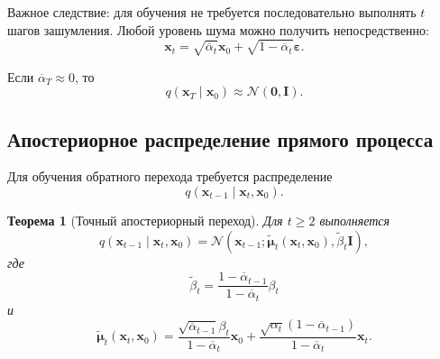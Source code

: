 \documentclass[12pt,a4paper]{article}
\newtheorem{theorem}{Теорема}[section]
\theoremstyle{definition}
\newcommand{\N}{\mathcal{N}}
\newcommand{\eps}{\varepsilon}
\newcommand{\1}{\mathbf{1}}
\begin{document}
Важное следствие: для обучения не требуется последовательно
выполнять $t$ шагов зашумления. Любой уровень шума можно получить
непосредственно:
\[
    \bm{x}_t
    =
    \sqrt{\overline{\alpha}_t}\bm{x}_0
    +
    \sqrt{1-\overline{\alpha}_t}\bm{\eps}.
\]

Если $\overline{\alpha}_T\approx 0$, то
\[
    q(\bm{x}_T\mid\bm{x}_0)
    \approx
    \N(\bm{0},\bm{I}).
\]

\subsection{Апостериорное распределение прямого процесса}

Для обучения обратного перехода требуется распределение
\[
    q(\bm{x}_{t-1}\mid\bm{x}_t,\bm{x}_0).
\]

\begin{theorem}[Точный апостериорный переход]
Для $t\geq 2$ выполняется
\[
    q(\bm{x}_{t-1}\mid\bm{x}_t,\bm{x}_0)
    =
    \N\left(
        \bm{x}_{t-1};
        \widetilde{\bm{\mu}}_t(\bm{x}_t,\bm{x}_0),
        \widetilde{\beta}_t\bm{I}
    \right),
\]
где
\[
    \widetilde{\beta}_t
    =
    \frac{1-\overline{\alpha}_{t-1}}
         {1-\overline{\alpha}_t}
    \beta_t
\]
и
\[
    \widetilde{\bm{\mu}}_t(\bm{x}_t,\bm{x}_0)
    =
    \frac{
        \sqrt{\overline{\alpha}_{t-1}}\beta_t
    }{
        1-\overline{\alpha}_t
    }\bm{x}_0
    +
    \frac{
        \sqrt{\alpha_t}
        (1-\overline{\alpha}_{t-1})
    }{
        1-\overline{\alpha}_t
    }\bm{x}_t.
\]
\end{theorem}
\end{document}
